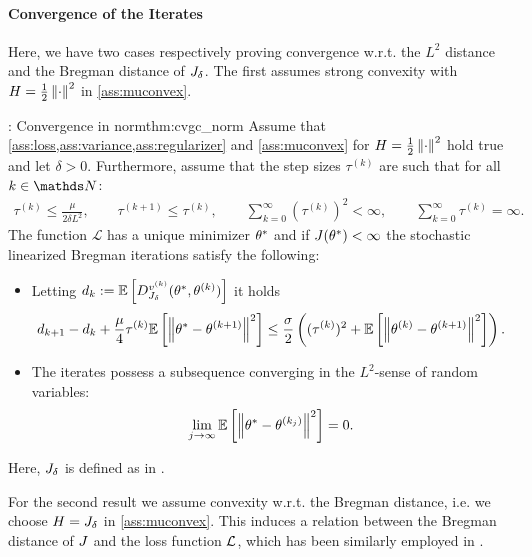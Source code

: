 \paragraph{Convergence of the Iterates}
Here, we have two cases respectively proving convergence w.r.t. the $L^2$ distance and the Bregman distance of $J_\delta$. The first assumes strong convexity with $H=\frac{1}{2}\left\|\cdot\right\|^2$ in \cref{ass:muconvex}.
%
%
\begin{theorem}{\cite[Th. 6]{bungert2022bregman}: Convergence in norm}{thm:cvgc_norm}
	Assume that \cref{ass:loss,ass:variance,ass:regularizer} and \cref{ass:muconvex} for $H=\frac{1}{2}\left\|\cdot\right\|^2$ hold true and let $\delta>0$.
	Furthermore, assume that the step sizes $\tau^{(k)}$ are such that for all $k\in\N$:
	\begin{align*}
		{\tau^{(k)}\leq \frac{\mu}{2\delta L^2}},\qquad
		\tau^{(k+1)} \leq \tau^{(k)}, \qquad
		\sum_{k=0}^\infty (\tau^{(k)})^2 < \infty, \qquad
		\sum_{k=0}^\infty \tau^{(k)} = \infty.
	\end{align*}
	The function $\mathcal{L}$ has a unique minimizer $\theta^*$ and if $J(\theta^*)<\infty$ the stochastic linearized Bregman iterations  satisfy the following:
	\begin{itemize}
		\item Letting $d_k:=\mathbb{E}\left[D_{J_\delta}^{v^{(k)}}(\theta^*,\theta^{(k)})\right]$ it holds
		\begin{align}\label{ineq:decay_bregman_distance}
			d_{k+1} - d_k + \frac{\mu}{4}\tau^{(k)}\mathbb{E}\left[\left\|\theta^*-\theta^{(k+1)}\right\|^2\right]
			\leq  \frac{\sigma}{2}\left((\tau^{(k)})^2 +\mathbb{E}\left[\left\|\theta^{(k)} - \theta^{(k+1)}\right\|^2\right]\right).
		\end{align}
		\item The iterates possess a subsequence converging in the $L^2$-sense of random variables: 
		\begin{align}
			\lim_{j\to\infty}\mathbb{E}\left[\left\|\theta^*-\theta^{(k_j)}\right\|^2\right] = 0.
		\end{align}
	\end{itemize}
	{Here, $J_\delta$ is defined as in .}
\end{theorem}
%
%
For the second result we assume convexity w.r.t. the Bregman distance, i.e. we choose $H=J_{\delta}$ in \cref{ass:muconvex}. This induces a relation between the Bregman distance of $J$ and the loss function $\mathcal{L}$, which has been similarly employed in \cite{dragomir2021fast}.
%
%
